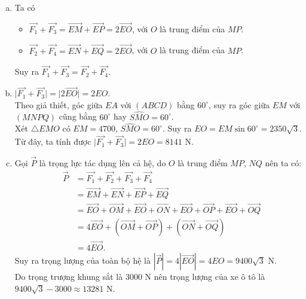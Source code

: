 \begin{ex}
{\begin{enumerate}[a)]
\begin{itemize}
			      \end{itemize}
			      Suy ra $\vec{F_1}+\vec{F_2}\ne \vec{F_3}+\vec{F_4}$
			\item Ta có
			      \begin{itemize}
				      \item [$\bullet$] $\vec{F_1}+\vec{F_3}=\vec{EM}+\vec{EP}=2\vec{EO}$, với $O$ là trung điểm của $MP$.
				      \item [$\bullet$] $\vec{F_2}+\vec{F_4}=\vec{EN}+\vec{EQ}=2\vec{EO}$, với $O$ là trung điểm của $MP$.
			      \end{itemize}
			      Suy ra $\vec{F_1}+\vec{F_3}=\vec{F_2}+\vec{F_4}$.
			\item $\big|\vec{F_1}+\vec{F_3}\big|=\big|2\vec{EO}\big|=2EO$.\\
			      Theo giả thiết, góc giữa $EA$ với $(ABCD)$ bằng $60^\circ$, suy ra góc giữa $EM$ với $(MNPQ)$ cũng bằng $60^\circ$ hay $\widehat{SMO}=60^\circ$.\\
			      Xét $\triangle EMO$ có $EM=4700$, $\widehat{SMO}=60^\circ$. Suy ra $EO = EM \sin 60^\circ = 2350\sqrt{3}$.\\
			      Từ đây, ta tính được $\big|\vec{F_1}+\vec{F_3}\big|=2EO=8141$ N.
			\item Gọi $\vec{P}$ là trọng lực tác dụng lên cả hệ, do $O$ là trung điểm $MP$, $NQ$ nên ta có:
			      \begin{eqnarray*}
				      & \vec{P} & = \vec{F_1}+\vec{F_2}+\vec{F_3}+\vec{F_4}\\
				      & & = \vec{EM} + \vec{EN} + \vec{EP} + \vec{EQ}\\
				      & & = \vec{EO} + \vec{OM} + \vec{EO} + \vec{ON} + \vec{EO} + \vec{OP} + \vec{EO} + \vec{OQ}\\
				      & & = 4\vec{EO} + \left(\vec{OM} + \vec{OP}\right) + \left(\vec{ON} + \vec{OQ}\right)\\
				      & & = 4\vec{EO}.
			      \end{eqnarray*}
			      Suy ra trọng lượng của toàn bộ hệ là $\left| \vec{P} \right| = 4\left| \vec{EO}\right| = 4EO = 9400\sqrt{3}$ N.\\
			      Do trọng trượng khung sắt là $3000$ N nên trọng lượng của xe ô tô là $9400\sqrt{3} - 3000 \approx 13281$ N.
		\end{enumerate}
	}
\end{ex}
